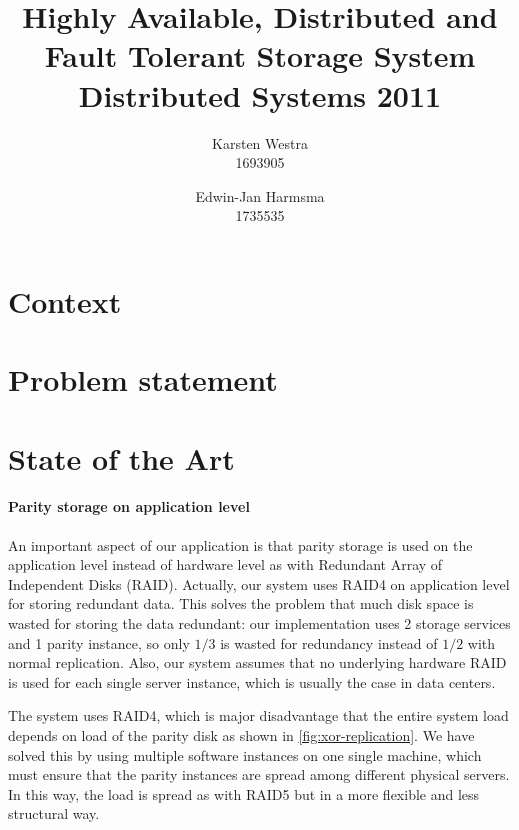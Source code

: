 \documentclass[12pt,a4paper]{scrartcl}
\title{\large{Highly Available, Distributed and Fault Tolerant Storage System} \\ \normalsize{Distributed Systems 2011}}
\author{Karsten Westra\\1693905 \and Edwin-Jan Harmsma\\1735535}
\begin{document}
\maketitle

\tableofcontents
\clearpage



\section{Context}

\section{Problem statement}

\section{State of the Art}
\label{sec:state-of-the-art}
\paragraph{Parity storage on application level}
An important aspect of our application is that parity storage is used on the application level instead of hardware level as with Redundant Array of Independent Disks (RAID).%
Actually, our system uses RAID4 on application level for storing redundant data. This solves the problem that much disk space is wasted for storing the data redundant: our implementation uses 2 storage services and 1 parity instance, so only $1/3$ is wasted for redundancy instead of $1/2$ with normal replication. Also, our system assumes that no underlying hardware RAID is used for each single server instance, which is usually the case in data centers.

The system uses RAID4, which is major disadvantage that the entire system load depends on load of the parity disk as shown in \autoref{fig:xor-replication}. We have solved this by using multiple software instances on one single machine, which must ensure that the parity instances are spread among different physical servers. In this way, the load is spread as with RAID5 but in a more flexible and less structural way.
\end{document}
